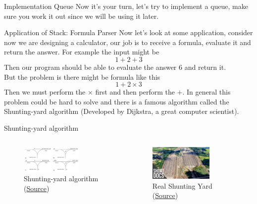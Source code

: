 \documentclass[10pt,xcolor={table,dvipsnames},t]{beamer}
\begin{document}
\begin{frame}{Implementation Queue}
  Now it's your turn, let's try to implement a queue, make sure you work it out since we will be using it later.
\end{frame}

\begin{frame}{Application of Stack: Formula Parser}
  Now let's look at some application, consider now we are designing a calculator, our job is to receive a formula, evaluate it and return the answer. For example the input might be 
  $$1+2+3$$
  Then our program should be able to evaluate the answer $6$ and return it.\\
  But the problem is there might be formula like this
  $$1+2\times 3$$
  Then we must perform the $\times$ first and then perform the $+$. In general this problem could be hard to solve and there is a famous algorithm called the Shunting-yard algorithm (Developed by Dijkstra, a great computer scientist).
\end{frame}

\begin{frame}{Shunting-yard algorithm}
  \begin{columns}
    \begin{column}[T]{0.5\textwidth}
      \begin{figure}
        \includegraphics[width=0.7\textwidth]{img/Shunting_yard.png}
        \caption{Shunting-yard algorithm (\href{https://en.wikipedia.org/wiki/Shunting_yard_algorithm}{Source})}
      \end{figure}
    \end{column}
    \begin{column}[T]{0.5\textwidth}
      \begin{figure}
        \includegraphics[width=0.7\textwidth]{img/Shuntingyard_real.jpg}
        \caption{Real Shunting Yard (\href{https://www.youtube.com/watch?v=ACNeDxew5Q4&ab_channel=FreeDocBites}{Source})}
      \end{figure}
    \end{column}
  \end{columns}
\end{frame}
\end{document}
